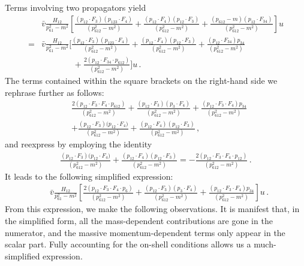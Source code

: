 \documentclass[a4paper,12pt]{article}
\makeatletter
\def\nn{\nonumber}
\newcommand{\mdot}{{\cdot}}
\newcommand*{\bigcdot}{}%
\DeclareRobustCommand*{\bigcdot}{%
  \mathbin{\mathpalette\bigcdot@{}}%
}
\newcommand*{\bigcdot@scalefactor}{.6}
\newcommand*{\bigcdot@widthfactor}{1.25}
\newcommand*{\bigcdot@}[2]{%
  \sbox0{$#1\vcenter{}$}%
  \sbox2{$#1\cdot\m@th$}%
  \hbox to \bigcdot@widthfactor\wd2{%
    \hfil
    \raise\ht0\hbox{%
      \scalebox{\bigcdot@scalefactor}{%
        \lower\ht0\hbox{$#1\bullet\m@th$}%
      }%
    }%
    \hfil
  }%
}
\newcommand{\dd}{\bigcdot}
\makeatother
\begin{document}
Terms involving two propagators yield
%
\begin{align}\label{6pteg}
   &\bar{v}\dd\frac{ H_{12}}{p_{61}^2-m^2}\dd\left[\frac{\left(p_{12}\mdot F_3\right)\dd \left(p_{123}\mdot F_4\right)}{(p_{612}^2-m^2) }+\frac{ \left(p_{12}\mdot F_4\right)\dd  \left(p_{12}\mdot F_3\right)}{(p_{612}^2-m^2)}+\frac{ (p_{612}-m)\dd \left(p_{12}\mdot F_{34}\right)}{(p_{612}^2-m^2) }\right]\dd u\nn\\
   =&\bar{v}\dd\frac{ H_{12}}{p_{61}^2-m^2}\dd\Big[\frac{ \left(p_{12}\mdot F_3\right)\dd \left(p_{123}\mdot F_4\right)}{(p_{612}^2-m^2)  }+\frac{ \left(p_{12}\mdot F_4\right)\dd  \left(p_{12}\mdot F_3\right)}{(p_{612}^2-m^2) }
   +\frac{ \left(p_{12}\mdot F_{34}\right)\dd p_{34}}{(p_{612}^2-m^2)  }\nn\\
 &~~~~~~~~~~~~~~~~~+\frac{2\left(p_{12}\mdot F_{34} \mdot p_{612}\right)}{(p_{612}^2-m^2) }\Big]\dd u  \, .
\end{align}
%
The terms contained within the square brackets on the right-hand side we rephrase further as follows:
%
\begin{align}
    &\frac{2\left(p_{12}\mdot F_3\mdot F_4 \mdot p_{612}\right)}{(p_{612}^2-m^2) }+
    \frac{ \left(p_{12}\mdot F_3\right)\dd \left(p_{3}\mdot F_4\right)}{(p_{612}^2-m^2) }
    +\frac{ \left(p_{12}\mdot F_3\mdot F_4\right)\dd p_{34}}{(p_{612}^2-m^2) }
   \nn\\
   & +\frac{ \left(p_{12}\mdot F_3\right)\dd \big(p_{12}\mdot F_4\big)}{(p_{612}^2-m^2) }
    +\frac{ \left(p_{12}\mdot F_4\right)\dd  \left(p_{12}\mdot F_3\right)}{(p_{612}^2-m^2) } \, ,
\end{align}
%
and reexpress by employing the identity %
%
\begin{align}
  \frac{ \left(p_{12}\mdot F_3\right)\dd \big(p_{12}\mdot F_4\big)}{(p_{612}^2-m^2) }
    +\frac{ \left(p_{12}\mdot F_4\right)\dd  \left(p_{12}\mdot F_3\right)}{(p_{612}^2-m^2) }=
    -\frac{2\left(p_{12}\mdot F_3\mdot F_4 \mdot p_{12}\right)}{(p_{612}^2-m^2) } \, .
\end{align}
%
It leads to the following simplified expression:
%
\begin{align}
    &\bar{v}\dd\frac{ H_{12}}{p_{61}^2-m^2}\dd\left[\frac{2\left(p_{12}\mdot F_3\mdot F_4 \mdot p_{6}\right)}{(p_{612}^2-m^2) }
    +\frac{ \left(p_{12}\mdot F_3\right)\dd  \left(p_{3}\mdot F_4\right)}{(p_{612}^2-m^2)}
    +\frac{ \left(p_{12}\mdot F_3\mdot F_4\right)\dd p_{34}}{(p_{612}^2-m^2) }
    \right]\dd u \, .
\end{align}
From this expression, we make the following observations. It is manifest that, in the simplified form, all the mass-dependent contributions are gone in the numerator, and the massive momentum-dependent terms only appear in the scalar part. Fully accounting for the on-shell conditions allows us a much-simplified expression.
\end{document}
